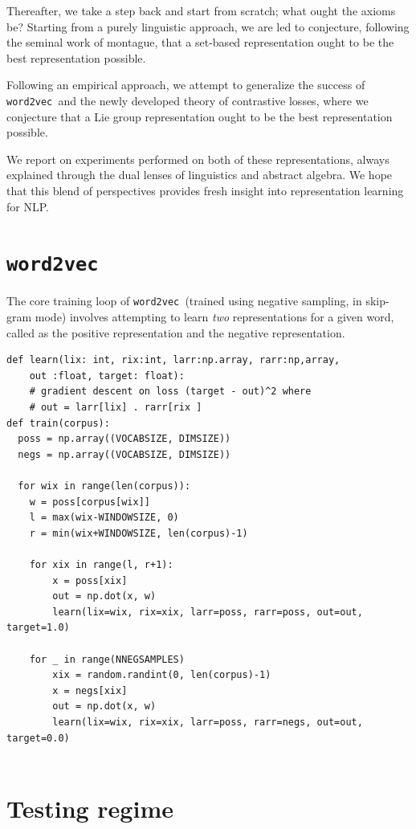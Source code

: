 \documentclass[11pt]{book}
\newcommand{\wtov}{\texttt{word2vec }}
\begin{document}
Thereafter, we take a step back and start from scratch; what ought the axioms
be? Starting from a purely linguistic approach, we are led to conjecture, following
the seminal work of montague, that a set-based representation ought to be
the best representation possible.

Following an empirical approach, we attempt to generalize the success
of \wtov and the newly developed theory of contrastive losses, where we conjecture
that a Lie group representation ought to be the best representation possible.

We report on experiments performed on both of these representations, always
explained through the dual lenses of linguistics and abstract algebra. We hope
that this blend of perspectives provides fresh insight into representation
learning for NLP.


\section{\wtov}

The core training loop of \wtov (trained using negative sampling, in skip-gram
mode) involves attempting to learn \emph{two} representations for a given word,
called as the positive representation and the negative representation.

\begin{verbatim}
def learn(lix: int, rix:int, larr:np.array, rarr:np,array,
    out :float, target: float):
    # gradient descent on loss (target - out)^2 where
    # out = larr[lix] . rarr[rix ]
def train(corpus):
  poss = np.array((VOCABSIZE, DIMSIZE))
  negs = np.array((VOCABSIZE, DIMSIZE))

  for wix in range(len(corpus)):
    w = poss[corpus[wix]]
    l = max(wix-WINDOWSIZE, 0)
    r = min(wix+WINDOWSIZE, len(corpus)-1)

    for xix in range(l, r+1):
        x = poss[xix]
        out = np.dot(x, w)
        learn(lix=wix, rix=xix, larr=poss, rarr=poss, out=out, target=1.0)

    for _ in range(NNEGSAMPLES)
        xix = random.randint(0, len(corpus)-1)
        x = negs[xix]
        out = np.dot(x, w)
        learn(lix=wix, rix=xix, larr=poss, rarr=negs, out=out, target=0.0)
    
\end{verbatim}


\section{Testing regime}
\end{document}
